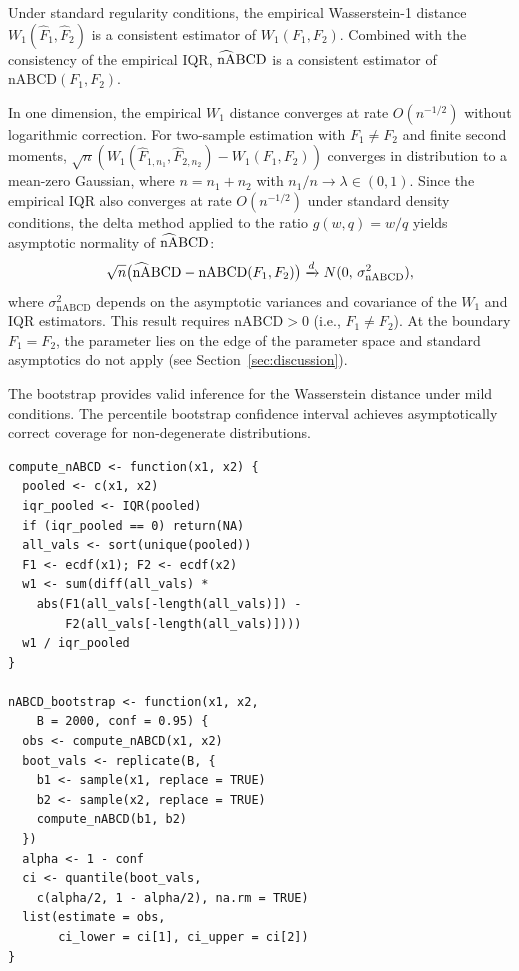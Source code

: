 \documentclass[AMA,Times1COL]{WileyNJDv5}
\newcommand{\hnABCD}{\mathrlap{\widehat{\phantom{\text{nA}}}}\text{nABCD}}
\begin{document}

Under standard regularity conditions, the empirical Wasserstein-1 distance $W_1(\hat{F}_1, \hat{F}_2)$ is a consistent estimator of $W_1(F_1, F_2)$.\cite{delbarrio1999} Combined with the consistency of the empirical IQR, $\hnABCD$ is a consistent estimator of $\text{nABCD}(F_1, F_2)$.

In one dimension, the empirical $W_1$ distance converges at rate $O(n^{-1/2})$ without logarithmic correction.\cite{delbarrio1999} For two-sample estimation with $F_1 \neq F_2$ and finite second moments, $\sqrt{n}(W_1(\hat{F}_{1,n_1}, \hat{F}_{2,n_2}) - W_1(F_1, F_2))$ converges in distribution to a mean-zero Gaussian, where $n = n_1 + n_2$ with $n_1/n \to \lambda \in (0,1)$. Since the empirical IQR also converges at rate $O(n^{-1/2})$ under standard density conditions, the delta method applied to the ratio $g(w, q) = w/q$ yields asymptotic normality of $\hnABCD$:
\begin{equation}
\sqrt{n}\bigl(\hnABCD - \text{nABCD}(F_1, F_2)\bigr) \xrightarrow{d} N(0,\, \sigma^2_{\text{nABCD}}),
\label{eq:asymptotic_normality}
\end{equation}
where $\sigma^2_{\text{nABCD}}$ depends on the asymptotic variances and covariance of the $W_1$ and IQR estimators. This result requires $\text{nABCD} > 0$ (i.e., $F_1 \neq F_2$). At the boundary $F_1 = F_2$, the parameter lies on the edge of the parameter space and standard asymptotics do not apply (see Section~\ref{sec:discussion}).

The bootstrap provides valid inference for the Wasserstein distance under mild conditions.\cite{sommerfeld2018} The percentile bootstrap confidence interval achieves asymptotically correct coverage for non-degenerate distributions.


\begin{lstlisting}[caption={R function for computing nABCD with bootstrap confidence intervals.},label=lst:nabcd,basicstyle=\fontsize{8}{10}\selectfont\ttfamily]
compute_nABCD <- function(x1, x2) {
  pooled <- c(x1, x2)
  iqr_pooled <- IQR(pooled)
  if (iqr_pooled == 0) return(NA)
  all_vals <- sort(unique(pooled))
  F1 <- ecdf(x1); F2 <- ecdf(x2)
  w1 <- sum(diff(all_vals) *
    abs(F1(all_vals[-length(all_vals)]) -
        F2(all_vals[-length(all_vals)])))
  w1 / iqr_pooled
}

nABCD_bootstrap <- function(x1, x2,
    B = 2000, conf = 0.95) {
  obs <- compute_nABCD(x1, x2)
  boot_vals <- replicate(B, {
    b1 <- sample(x1, replace = TRUE)
    b2 <- sample(x2, replace = TRUE)
    compute_nABCD(b1, b2)
  })
  alpha <- 1 - conf
  ci <- quantile(boot_vals,
    c(alpha/2, 1 - alpha/2), na.rm = TRUE)
  list(estimate = obs,
       ci_lower = ci[1], ci_upper = ci[2])
}
\end{lstlisting}
\end{document}
